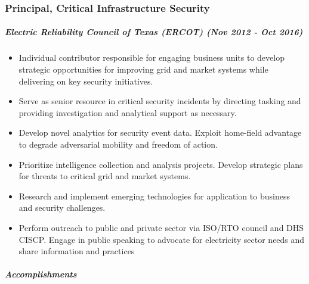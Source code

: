 \documentclass[10pt,]{article}
\providecommand{\tightlist}{%
  \setlength{\itemsep}{0pt}\setlength{\parskip}{0pt}}
\let\oldsubparagraph\subparagraph
\renewcommand{\subparagraph}[1]{\oldsubparagraph{#1}\mbox{}}
\begin{document}
\subsubsection{Principal, Critical Infrastructure
Security}\label{principal-critical-infrastructure-security}

\subparagraph{\texorpdfstring{\emph{Electric Reliability Council of
Texas (ERCOT)} (Nov 2012 - Oct
2016)}{Electric Reliability Council of Texas (ERCOT) (Nov 2012 - Oct 2016)}}\label{electric-reliability-council-of-texas-ercot-nov-2012---oct-2016}

\begin{itemize}
\tightlist
\item
  Individual contributor responsible for engaging business units to
  develop strategic opportunities for improving grid and market systems
  while delivering on key security initiatives.
\item
  Serve as senior resource in critical security incidents by directing
  tasking and providing investigation and analytical support as
  necessary.
\item
  Develop novel analytics for security event data. Exploit home-field
  advantage to degrade adversarial mobility and freedom of action.
\item
  Prioritize intelligence collection and analysis projects. Develop
  strategic plans for threats to critical grid and market systems.
\item
  Research and implement emerging technologies for application to
  business and security challenges.
\item
  Perform outreach to public and private sector via ISO/RTO council and
  DHS CISCP. Engage in public speaking to advocate for electricity
  sector needs and share information and practices
\end{itemize}

\subparagraph{Accomplishments}\label{accomplishments}
\end{document}
